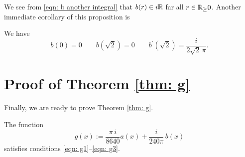   We see from \eqref{eqn: b another integral} that $b(r)\in i\mathbb{R}$ far all $r\in\mathbb{R}_\geq{0}$. Another immediate corollary of this proposition is
  \begin{proposition}\label{prop: b values}
  We have
  \begin{equation}\label{eqn: b values}
  b(0)=0\qquad
  b(\sqrt{2})=0\qquad
  b^\prime(\sqrt{2})=\frac{i}{2\sqrt{2}\,\pi}.
  \end{equation}
  \end{proposition}

  \section{Proof of Theorem \ref{thm: g}}\label{sec: g}
  Finally, we are ready to prove Theorem \ref{thm: g}.
  \begin{theorem}\label{thm: g1}
  The function
  $$g(x):=\frac{\pi\,i}{8640}a(x)+\frac{i}{240\pi}\,b(x)$$
  satisfies conditions \eqref{eqn: g1}--\eqref{eqn: g3}.
  \end{theorem}
